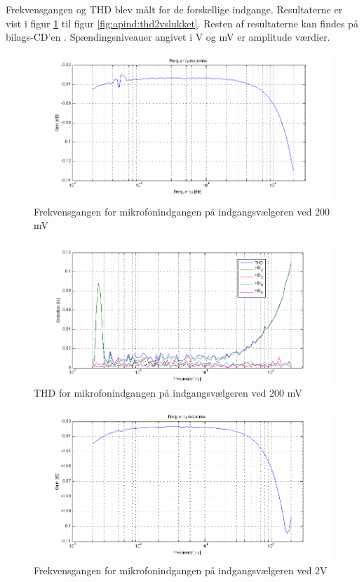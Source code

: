 Frekvensgangen og THD blev målt for de forskellige indgange. Resultaterne er vist i figur \ref{fig:apind:frek200mv} til figur \ref{fig:apind:thd2vslukket}. Resten af resultaterne kan findes på bilags-CD'en \cite{indgangsvaelger-maalinng}%
. Spændingsniveauer angivet i V og mV er amplitude værdier. 

\begin{figure}[h]
\centering
\includegraphics[width=\textwidth]{maalerapporter/indgangsvaelger/Indgangsvlger-mic-200mv-frek.png}
\caption{Frekvensgangen for mikrofonindgangen på indgangsvælgeren ved 200 mV}
\label{fig:apind:frek200mv}
\end{figure}

\begin{figure}[h]
\centering
\includegraphics[width=\textwidth]{maalerapporter/indgangsvaelger/Indgangsvlger-mic-200mv-thd.png}
\caption{THD for mikrofonindgangen på indgangsvælgeren ved 200 mV}
\label{fig:apind:thd200mv}
\end{figure}

\begin{figure}[h]
\centering
\includegraphics[width=\textwidth]{maalerapporter/indgangsvaelger/Indgangsvlger-mic-2v-frek.png}
\caption{Frekvensgangen for mikrofonindgangen på indgangsvælgeren ved 2V}
\label{fig:apind:frek2v}
\end{figure}

